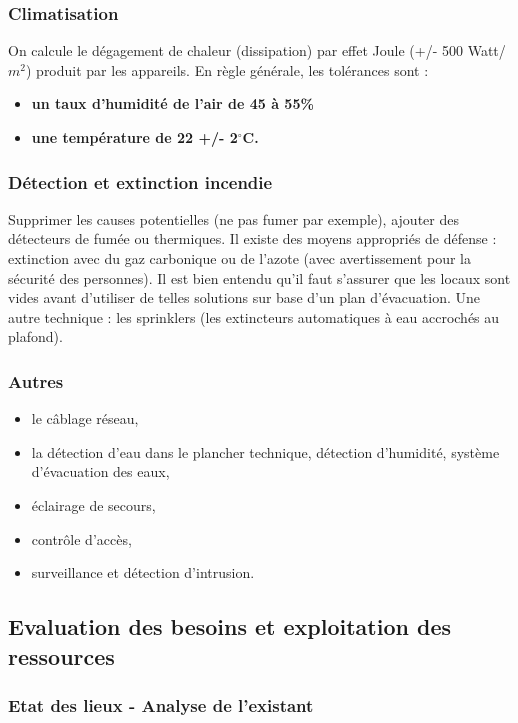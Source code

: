 \documentclass[10pt,a4paper,oneside,titlepage]{report}
\begin{document}
\begin{sffamily}
\subsubsection{Climatisation}

On calcule le dégagement de chaleur (dissipation) par effet Joule (+/- 500 Watt/$m^2$) produit par les appareils. En règle générale, les tolérances sont : \begin{itemize}
\item \textbf{un taux d'humidité de l'air de 45 à 55\%}
\item \textbf{une température de 22 +/- 2$^\circ$C.}
\end{itemize}

\subsubsection{Détection et extinction incendie}

Supprimer les causes potentielles (ne pas fumer par exemple), ajouter des détecteurs de fumée ou thermiques. Il existe des moyens appropriés de défense : extinction avec du gaz carbonique ou de l'azote (avec avertissement pour la sécurité des 
personnes). Il est bien entendu qu'il faut s'assurer que les locaux sont vides avant d'utiliser de telles solutions sur base d'un plan d'évacuation. Une autre technique : les sprinklers (les extincteurs automatiques à eau accrochés au plafond).

\subsubsection{Autres}

\begin{itemize}
\item le c\^ablage réseau,
\item la détection d'eau dans le plancher technique, détection d'humidité, système d'évacuation des eaux,
\item éclairage de secours,
\item contr\^ole d'accès,
\item surveillance et détection d'intrusion.
\end{itemize}

\subsection{Evaluation des besoins et exploitation des ressources}

\subsubsection{Etat des lieux - Analyse de l'existant}


\end{sffamily}
\end{document}
